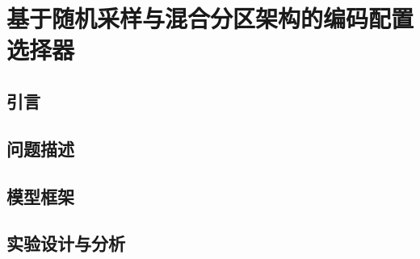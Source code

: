 
\chapter{基于随机采样与混合分区架构的编码配置选择器}

\section{引言}

\section{问题描述}

\section{模型框架}

\section{实验设计与分析}


